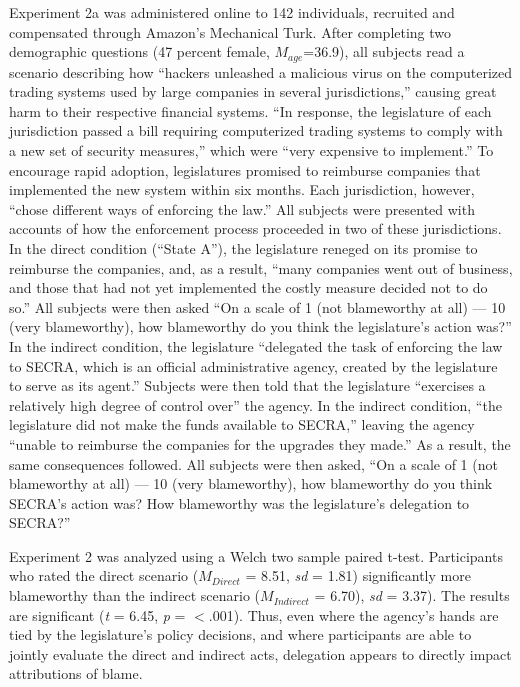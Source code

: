 \documentclass{article}
\begin{document}
Experiment 2a was administered online to 142 individuals, recruited and compensated through Amazon's Mechanical Turk. After completing two demographic questions (47 percent female, ${M}_{age}$=36.9), all subjects read a scenario describing how ``hackers unleashed a malicious virus on the computerized trading systems used by large companies in several jurisdictions,'' causing great harm to their respective financial systems. ``In response, the legislature of each jurisdiction passed a bill requiring computerized trading systems to comply with a new set of security measures,'' which were ``very expensive to implement.'' To encourage rapid adoption, legislatures promised to reimburse companies that implemented the new system within six months. Each jurisdiction, however, ``chose different ways of enforcing the law.'' All subjects were presented with accounts of how the enforcement process proceeded in two of these jurisdictions. In the direct condition (``State A''), the legislature reneged on its promise to reimburse the companies, and, as a result, ``many companies went out of business, and those that had not yet implemented the costly measure decided not to do so.'' All subjects were then asked ``On a scale of 1 (not blameworthy at all) --- 10 (very blameworthy), how blameworthy do you think the legislature's action was?'' In the indirect condition, the legislature ``delegated the task of enforcing the law to SECRA, which is an official administrative agency, created by the legislature to serve as its agent.'' Subjects were then told that the legislature ``exercises a relatively high degree of control over'' the agency. In the indirect condition, ``the legislature did not make the funds available to SECRA,'' leaving the agency ``unable to reimburse the companies for the upgrades they made.'' As a result, the same consequences followed. All subjects were then asked, ``On a scale of 1 (not blameworthy at all) --- 10 (very blameworthy), how blameworthy do you think SECRA's action was? How blameworthy was the legislature's delegation to SECRA?''

Experiment 2 was analyzed using a Welch two sample paired t-test. Participants who rated the direct scenario (${M}_{Direct}$ = 8.51, \emph{sd} = 1.81) significantly more blameworthy than the indirect scenario (${M}_{Indirect}$ = 6.70), \emph{sd} = 3.37). The results are significant (\emph{t} = 6.45, \emph{p} = $<$.001). Thus, even where the agency's hands are tied by the legislature's policy decisions, and where participants are able to jointly evaluate the direct and indirect acts, delegation appears to directly impact attributions of blame. 
\end{document}
